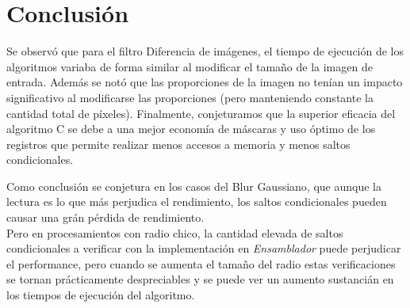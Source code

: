 \section{Conclusi\'on}
Se observ\'o que para el filtro Diferencia de im\'agenes, el tiempo de ejecuci\'on de los algoritmos variaba de forma similar al modificar el tama\~no de la imagen de entrada. Adem\'as se not\'o que las proporciones de la imagen no ten\'ian un impacto significativo al modificarse las proporciones (pero manteniendo constante la cantidad total de p\'ixeles). Finalmente, conjeturamos que la superior eficacia del algoritmo C se debe a una mejor econom\'ia de m\'ascaras y uso \'optimo de los registros que permite realizar menos accesos a memoria y menos saltos condicionales.

Como conclusi\'on se conjetura en los casos del Blur Gaussiano, que aunque la lectura es lo que m\'as perjudica el rendimiento, los saltos condicionales pueden causar una gr\'an p\'erdida de rendimiento. \\
Pero en procesamientos con radio chico, la cantidad elevada de saltos condicionales a verificar con la implementaci\'on en \emph{Ensamblador} puede perjudicar el performance, pero cuando se aumenta el tama\~no del radio estas verificaciones se tornan pr\'acticamente despreciables y se puede ver un aumento sustanci\'an en los tiempos de ejecuci\'on del algoritmo.

\pagebreak

